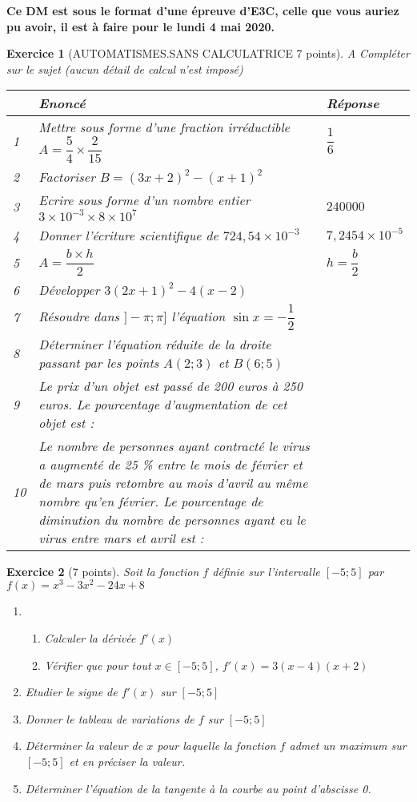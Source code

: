 \documentclass[11pt,a4paper]{article}
\renewcommand{\arraystretch}{1}
\theoremstyle{break}
\newtheorem{exo}{Exercice}
\begin{document}
	\textbf{Ce DM est sous le format d'une épreuve d'E3C, celle que vous auriez pu avoir, il est à faire pour le lundi 4 mai 2020.}
\begin{exo}[AUTOMATISMES.SANS CALCULATRICE 7  points] 
 A Compléter sur le sujet (aucun détail de calcul n'est imposé)\\
{\renewcommand{\arraystretch}{2}
\begin{tabular}{|p{1cm}|p{10cm}|p{5.5cm}| }
	\hline
&Enoncé&Réponse\\
\hline
1&Mettre sous forme d'une fraction irréductible $A= \dfrac54 \times \dfrac2{15}$& $\dfrac16$\\
\hline
2&Factoriser $B= (3x+2)^2 - (x+1)^2$&$ $\\
\hline
3&Ecrire sous forme d'un nombre entier $3\times10^{-3}\times8\times10^7$& $240000$\\
\hline
4&Donner l'écriture scientifique de $724,54 \times 10^{-3}$&$7,2454\times 10^{-5} $\\
\hline
5& $A=\dfrac{b\times h}{2}$ & $h=\dfrac{b}2$\\
\hline
6&Développer $3(2x+1)^2-4(x-2)$&\\
\hline
7& Résoudre dans $]-\pi ; \pi]$ l'équation $\sin x = -\dfrac12$ & \\
\hline
8& Déterminer l'équation réduite  de la droite passant par les points $A(2 ; 3)$ et $B( 6 ; 5)$ & \\
\hline
9&Le prix d'un objet est passé de 200 euros à 250 euros. Le pourcentage d'augmentation de cet objet est : & \\
\hline
10& Le nombre de personnes ayant contracté le virus a augmenté de 25 \% entre le mois de février et de mars puis retombre au mois d'avril au même nombre qu'en février. Le pourcentage de diminution du nombre de personnes ayant eu le virus entre mars et avril est : & \\
\hline

\end{tabular}}

\end{exo}
\newpage
\begin{exo}[7 points]
	Soit la fonction $f$ définie sur l'intervalle $[ -5 ; 5 ]$ par $f(x)=x^3-3x^2-24x+8$
	\begin{enumerate}
		\item 
		\begin{enumerate}
			\item Calculer la dérivée $f'(x)$
			\item Vérifier que pour tout $x \in [ -5 ; 5]$, $ f'(x)= 3 (x-4)(x+2)$
		\end{enumerate}
		\item Etudier le signe de $f '(x )$ sur $[ -5 ; 5 ]$
		 
		 \item Donner le tableau de variations de $f$ sur $[ -5 ; 5 ]$
		 \item Déterminer la valeur de $x$ pour laquelle la fonction $f$ admet un maximum sur $[ -5 ; 5 ]$ et en préciser la valeur.
		 \item  Déterminer l'équation de la tangente à la courbe au point d'abscisse 0.
	
	\end{enumerate}
\end{exo}
\end{document}
